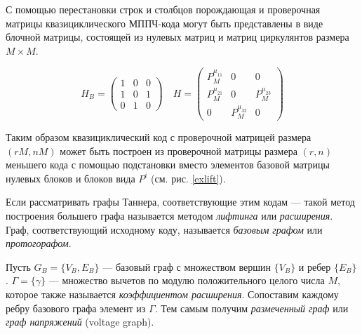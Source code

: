 
С помощью перестановки строк и столбцов порождающая и проверочная матрицы квазициклического МППЧ-кода
могут быть представлены в виде блочной матрицы, состоящей из нулевых матриц и матриц циркулянтов размера
$M \times M$.

\begin{equation} \label{exlift}
	H_B=\begin{pmatrix}
		1 & 0 & 0 \\
		1 & 0 & 1 \\
		0 & 1 & 0
	\end{pmatrix}
	\quad
	H=\begin{pmatrix}
		P^{\mu_{11}}_M & 0 & 0 \\
		P^{\mu_{21}}_M & 0 & P^{\mu_{23}}_M \\
		0 & P^{\mu_{32}}_M & 0
	\end{pmatrix}
\end{equation}

Таким образом квазициклический код с проверочной матрицей размера $(rM,nM)$ может быть построен из проверочной
матрицы размера $(r,n)$ меньшего кода с помощью подстановки вместо элементов базовой матрицы нулевых блоков
 и блоков вида $P^i$ (см. рис. \ref{exlift}). 
 
  Если рассматривать графы Таннера, соответствующие этим кодам --- такой метод построения
 большего графа называется методом \textit{лифтинга} или \textit{расширения}. Граф, соответствующий 
 исходному коду, называется \textit{базовым графом} или \textit{протогорафом}.

Пусть $G_B=\{V_B, E_B\}$ --- базовый граф с множеством вершин $\{V_B\}$ и ребер $\{E_B\}$.
$\Gamma=\{\gamma\}$ --- множество вычетов по модулю положительного целого числа $M$, которое также 
называется \textit{коэффициентом расширения}. Сопоставим каждому ребру базового графа элемент из $\Gamma$.
Тем самым получим \textit{размеченный граф} или \textit{граф напряжений} (voltage graph).


